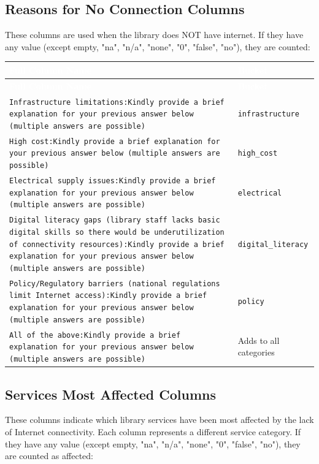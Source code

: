 \documentclass[11pt,a4paper]{article}
\begin{document}
\subsection{Reasons for No Connection Columns}

These columns are used when the library does NOT have internet. If they have any value (except empty, "na", "n/a", "none", "0", "false", "no"), they are counted:

\begin{longtable}{|p{11cm}|p{3cm}|}
\hline
\rowcolor{headerblue}\textcolor{white}{\textbf{Full Column Name}} & \textcolor{white}{\textbf{Bucket}} \\
\hline
\endfirsthead
\hline
\rowcolor{headerblue}\textcolor{white}{\textbf{Full Column Name}} & \textcolor{white}{\textbf{Bucket}} \\
\hline
\endhead
\texttt{Infrastructure limitations:Kindly provide a brief explanation for your previous answer below (multiple answers are possible)} & \texttt{infrastructure} \\
\hline
\texttt{High cost:Kindly provide a brief explanation for your previous answer below (multiple answers are possible)} & \texttt{high\_cost} \\
\hline
\texttt{Electrical supply issues:Kindly provide a brief explanation for your previous answer below (multiple answers are possible)} & \texttt{electrical} \\
\hline
\texttt{Digital literacy gaps (library staff lacks basic digital skills so there would be underutilization of connectivity resources):Kindly provide a brief explanation for your previous answer below (multiple answers are possible)} & \texttt{digital\_literacy} \\
\hline
\texttt{Policy/Regulatory barriers (national regulations limit Internet access):Kindly provide a brief explanation for your previous answer below (multiple answers are possible)} & \texttt{policy} \\
\hline
\texttt{All of the above:Kindly provide a brief explanation for your previous answer below (multiple answers are possible)} & Adds to all categories \\
\hline
\end{longtable}

\subsection{Services Most Affected Columns}

These columns indicate which library services have been most affected by the lack of Internet connectivity. Each column represents a different service category. If they have any value (except empty, "na", "n/a", "none", "0", "false", "no"), they are counted as affected:
\end{document}
